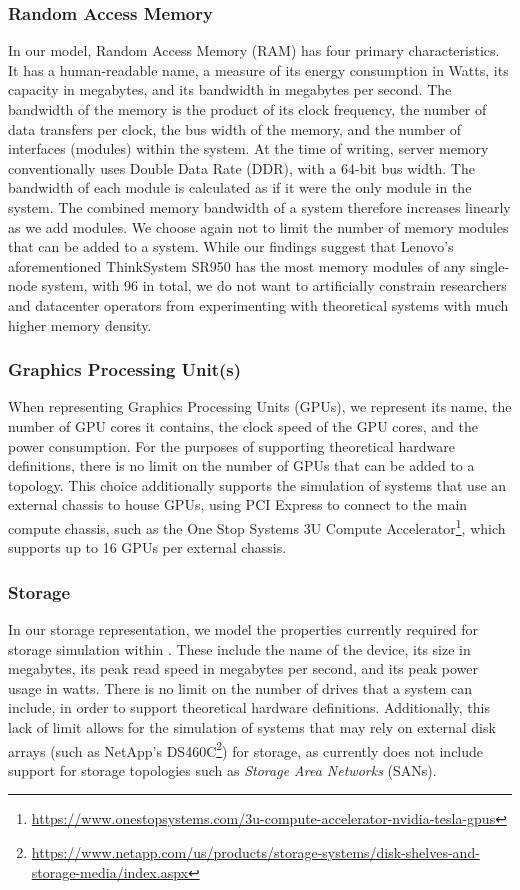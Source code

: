 \documentclass[11pt]{article}
\begin{document}
		\subsubsection{Random Access Memory}
			In our model, Random Access Memory (RAM) has four primary characteristics.
			It has a human-readable name, a measure of its energy consumption in Watts, its capacity in megabytes, and its bandwidth in megabytes per second.
			The bandwidth of the memory is the product of its clock frequency, the number of data transfers per clock, the bus width of the memory, and the number of interfaces (modules) within the system.
			At the time of writing, server memory conventionally uses Double Data Rate (DDR), with a 64-bit bus width.
			The bandwidth of each module is calculated as if it were the only module in the system.
			The combined memory bandwidth of a system therefore increases linearly as we add modules.
			We choose again not to limit the number of memory modules that can be added to a system.
			While our findings suggest that Lenovo's aforementioned ThinkSystem SR950 has the most memory modules of any single-node system, with 96 in total, we do not want to artificially constrain researchers and datacenter operators from experimenting with theoretical systems with much higher memory density.

		\subsubsection{Graphics Processing Unit(s)}
			When representing Graphics Processing Units (GPUs), we represent its name, the number of GPU cores it contains, the clock speed of the GPU cores, and the power consumption.
			For the purposes of supporting theoretical hardware definitions, there is no limit on the number of GPUs that can be added to a topology. 
			This choice additionally supports the simulation of systems that use an external chassis to house GPUs, using PCI Express to connect to the main compute chassis, such as the One Stop Systems 3U Compute Accelerator\footnote{\url{https://www.onestopsystems.com/3u-compute-accelerator-nvidia-tesla-gpus}}, which supports up to 16 GPUs per external chassis. 

		\subsubsection{Storage}
			In our storage representation, we model the properties currently required for storage simulation within \opendc{}.
			These include the name of the device, its size in megabytes, its peak read speed in megabytes per second, and its peak power usage in watts.
			There is no limit on the number of drives that a system can include, in order to support theoretical hardware definitions.
			Additionally, this lack of limit allows for the simulation of systems that may rely on external disk arrays (such as NetApp's DS460C\footnote{\url{https://www.netapp.com/us/products/storage-systems/disk-shelves-and-storage-media/index.aspx}}) for storage, as \opendc{} currently does not include support for storage topologies such as \textit{Storage Area Networks} (SANs).
	
\end{document}
